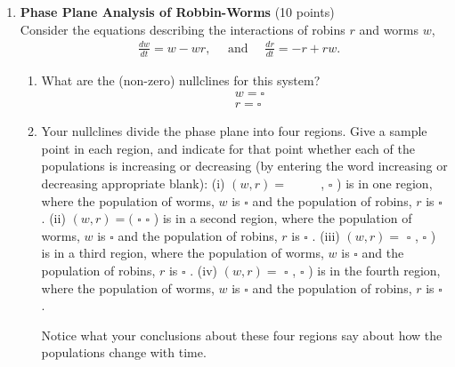 \begin{enumerate}
  \item \textbf{Phase Plane Analysis of Robbin-Worms} (10 points)\\
  Consider the equations describing the interactions of robins $r$ and worms $w$,
  $$
  \begin{aligned}
  & \frac{d w}{d t}=w-w r, \quad \text { and } \quad \frac{d r}{d t}=-r+r w .
  \end{aligned}
  $$
  \begin{enumerate}[label=\alph*]
    \item What are the (non-zero) nullclines for this system?
    $$
    \begin{aligned}
    & w=\square \\
    & r=\square
    \end{aligned}
    $$
    \begin{subanswer}
    \end{subanswer}
    \item Your nullclines divide the phase plane into four regions. Give a sample point in each region, and indicate for that point whether each of the populations is increasing or decreasing (by entering the word increasing or decreasing appropriate blank):
    (i) $(w, r)=$ $\qquad$ , $\square$ ) is in one region, where the population of worms, $w$ is $\square$ and the population of robins, $r$ is $\square$ .
    (ii) $(w, r)=($ $\square$
    $\square$ ) is in a second region, where the population of worms, $w$ is $\square$ and the population of robins, $r$ is $\square$ .
    (iii) $(w, r)=$ $\square$ , $\square$ ) is in a third region, where the population of worms, $w$ is $\square$ and the population of robins, $r$ is $\square$ .
    (iv) $(w, r)=$ $\square$ , $\square$ ) is in the fourth region, where the population of worms, $w$ is $\square$ and the population of robins, $r$ is $\square$ .
    \begin{subanswer}
    \end{subanswer}
    Notice what your conclusions about these four regions say about how the populations change with time.
  \end{enumerate}


\end{enumerate}
